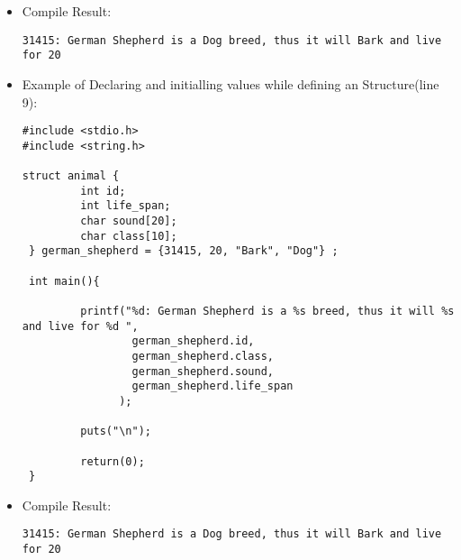 \begin{itemize}
\begin{lstlisting}
int main(){
   
    german_shepherd.id = 31415;
    german_shepherd.life_span = 20;
    //german_shepherd.sound = "Bark";
    strcpy(german_shepherd.sound,"Bark");
    //german_shepherd.class = "Dog"
    strcpy(german_shepherd.class,"Dog");
   
    printf("%d: German Shepherd is a %s breed, thus it will %s and live for %d ",
        german_shepherd.id,
        german_shepherd.class,
        german_shepherd.sound,
        german_shepherd.life_span
    );
   
    puts("\n");
    return(0);
}
\end{lstlisting}

\item Compile Result:
\begin{lstlisting}
31415: German Shepherd is a Dog breed, thus it will Bark and live for 20
\end{lstlisting}

\item Example of Declaring and initialling values while defining an Structure(line 9):
\begin{lstlisting}
#include <stdio.h>
#include <string.h>

struct animal {
         int id;
         int life_span;
         char sound[20];
         char class[10];
 } german_shepherd = {31415, 20, "Bark", "Dog"} ;

 int main(){

         printf("%d: German Shepherd is a %s breed, thus it will %s and live for %d ",
                 german_shepherd.id,
                 german_shepherd.class,
                 german_shepherd.sound,
                 german_shepherd.life_span
               );

         puts("\n");

         return(0);
 }
\end{lstlisting}
\item Compile Result:
\begin{lstlisting}
31415: German Shepherd is a Dog breed, thus it will Bark and live for 20
\end{lstlisting}
\end{itemize} 


